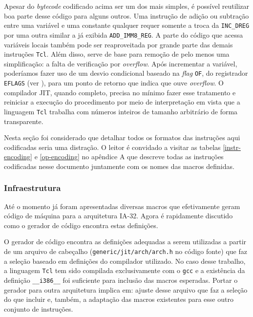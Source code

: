 Apesar do \textit{bytecode} codificado acima ser um dos mais simples, é
possível reutilizar boa parte desse código para alguns outros. Uma
instrução de adição ou subtração entre uma variável e uma constante
qualquer requer somente a troca da \verb!INC_DREG! por uma outra
similar a já exibida \verb!ADD_IMM8_REG!. A parte do código que acessa
variáveis locais também pode ser reaproveitada por grande parte das
demais instruções \texttt{Tcl}. Além disso, serve de base para remoção
de pelo menos uma simplificação: a falta de verificação por
\textit{overflow}. Após incrementar a variável, poderíamos fazer uso
de um desvio condicional baseado na \textit{flag} \verb!OF!, do
registrador \verb!EFLAGS! (ver ),
para um ponto de retorno que indica que
ouve \textit{overflow}. O compilador JIT, quando completo, precisa no
mínimo fazer esse tratamento e reiniciar a execução do procedimento por meio
de interpretação em vista que a linguagem \texttt{Tcl}
trabalha com números inteiros de tamanho arbitrário de forma
transparente.

Nesta seção foi considerado que detalhar todos os formatos das instruções aqui
codificadas seria uma distração. O leitor é convidado a visitar as
tabelas \ref{instr-encoding} e \ref{op-encoding} no apêndice A que
descreve todas as instruções codificadas nesse documento juntamente
com os nomes das macros definidas.


\subsubsection{Infraestrutura}

Até o momento já foram apresentadas diversas macros que efetivamente
geram código de máquina para a arquitetura IA-32. Agora é rapidamente
discutido como o gerador de código encontra estas definições.

O gerador de código encontra as definições adequadas a serem
utilizadas a partir de um arquivo de cabeçalho
(\verb!generic/jit/arch/arch.h! no código fonte) que faz a seleção
baseado em definições do compilador utilizado. No caso desse trabalho,
a linguagem \texttt{Tcl} tem sido compilada exclusivamente com o
\texttt{gcc} e a existência da definição \verb!__i386__! foi
suficiente para inclusão das macros esperadas. Portar o gerador para
outra arquitetura implica em: ajuste desse arquivo que faz a seleção do
que incluir e, também, a adaptação das macros existentes para esse outro
conjunto de instruções.

%


